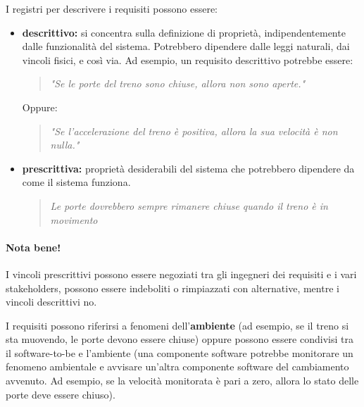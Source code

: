 I registri per descrivere i requisiti possono essere:
\begin{itemize}
	\item \textbf{descrittivo:} si concentra sulla definizione di proprietà, indipendentemente dalle funzionalità del sistema. Potrebbero dipendere dalle leggi naturali, dai vincoli fisici, e così via. Ad esempio, un requisito descrittivo potrebbe essere:
	\begin{quotation}
		\textit{"Se le porte del treno sono chiuse, allora non sono aperte."}
	\end{quotation}
	Oppure:
	\begin{quotation}
		\textit{"Se l'accelerazione del treno è positiva, allora la sua velocità è non nulla."}
	\end{quotation}
	\item \textbf{prescrittiva:} proprietà desiderabili del sistema che potrebbero dipendere da come il sistema funziona.
	\begin{quotation}
		\textit{Le porte dovrebbero sempre rimanere chiuse quando il treno è in movimento}
	\end{quotation}
\end{itemize}
\paragraph{\textbf{Nota bene!}}I vincoli prescrittivi possono essere negoziati tra gli ingegneri dei requisiti e i vari stakeholders, possono essere indeboliti o rimpiazzati con alternative, mentre i vincoli descrittivi no.

I requisiti possono riferirsi a fenomeni dell'\textbf{ambiente} (ad esempio, se il treno si sta muovendo, le porte devono essere chiuse) oppure possono essere condivisi tra il software-to-be e l'ambiente (una componente software potrebbe monitorare un fenomeno ambientale e avvisare un'altra componente software del cambiamento avvenuto. Ad esempio, se la velocità monitorata è pari a zero, allora lo stato delle porte deve essere chiuso).

